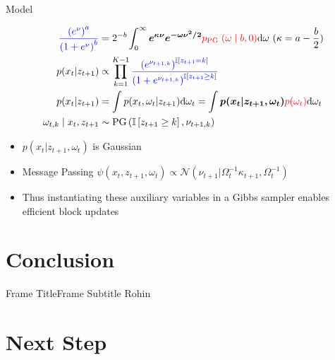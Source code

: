 \documentclass{beamer}
\begin{document}
\begin{frame}{Model}%
        \begin{tcolorbox}[colback=blue!10!white,colframe=blue!50!black,title=Polya-gamma augmentation ,boxrule=2pt, boxsep=0.1em, left=0.1em, right=0.1em,
fontupper=\fontsize{8}{10}\selectfont]

\begin{align}
\textcolor{blue}{ \frac{\left(e^{\nu}\right)^{a}}{\left(1+e^{\nu}\right)^{b}} } &=2^{-b}  \int_{0}^{\infty} \boldsymbol{e^{\kappa \nu} e^{-\omega \nu^{2} / 2} }\textcolor{red} {  p_{\text {PG }}(\omega \mid b, 0) }\mathrm{d} \omega \text{ }(\kappa=a-\frac{b}{2})\\
p(x_{t}|z_{t+1}) &\propto \prod_{k=1}^{K-1} \textcolor{blue}{  \frac{\left(e^{\nu_{t+1, k}}\right)^{\mathbb{I}\left[z_{t+1}=k\right]}}{\left(1+e^{\nu_{t+1, k}}\right)^{\mathbb{I}\left[z_{t+1} \geq k\right]}} }\\
p(x_t|z_{t+1})&=\int p(x_t,\omega_t|z_{t+1})  \mathrm{d}\omega_t=\int   \boldsymbol{ p(x_t|z_{t+1},\omega_t) }\textcolor{red}{ p(\omega_t) } \mathrm{d}\omega_t  \\
\omega_{t, k} \mid x_{t}, z_{t+1} &\sim \operatorname{PG}\left(\mathbb{I}\left[z_{t+1} \geq k\right], \nu_{t+1, k}\right) 
\end{align}

\end{tcolorbox}
\begin{itemize}
\item $p(x_t|z_{t+1},\omega_t)$ is Gaussian 
\item Message Passing $\psi(x_t,z_{t+1},\omega_t) \propto \mathcal{N}(\nu_{t+1}|\Omega^{-1}_t \kappa_{t+1},\Omega^{-1}_t)$
\item Thus instantiating these auxiliary variables in a Gibbs
sampler enables efficient block updates
\end{itemize}

    \end{frame}


\section{Conclusion}

\begin{frame}{Frame Title}{Frame Subtitle}
        Rohin

    \end{frame}

\section{Next Step}
\end{document}
